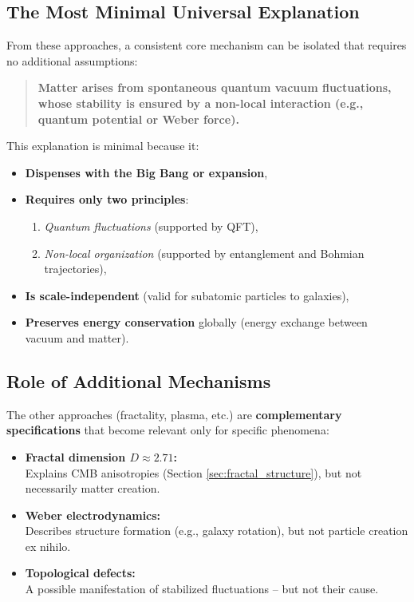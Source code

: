\subsection{The Most Minimal Universal Explanation}
From these approaches, a consistent core mechanism can be isolated that requires no additional assumptions:
\begin{quote}
    \textbf{Matter arises from spontaneous quantum vacuum fluctuations, whose stability is ensured by a non-local interaction (e.g., quantum potential or Weber force).}
\end{quote}
This explanation is minimal because it:
\begin{itemize}
    \item \textbf{Dispenses with the Big Bang or expansion},
    \item \textbf{Requires only two principles}:
    \begin{enumerate}
        \item \textit{Quantum fluctuations} (supported by QFT),
        \item \textit{Non-local organization} (supported by entanglement and Bohmian trajectories),
    \end{enumerate}
    \item \textbf{Is scale-independent} (valid for subatomic particles to galaxies),
    \item \textbf{Preserves energy conservation} globally (energy exchange between vacuum and matter).
\end{itemize}

\subsection{Role of Additional Mechanisms}
The other approaches (fractality, plasma, etc.) are \textbf{complementary specifications} that become relevant only for specific phenomena:
\begin{itemize}
    \item \textbf{Fractal dimension $D \approx 2.71$:}\\Explains CMB anisotropies (Section \ref{sec:fractal_structure}), but not necessarily matter creation.
    \item \textbf{Weber electrodynamics:}\\Describes structure formation (e.g., galaxy rotation), but not particle creation ex nihilo.
    \item \textbf{Topological defects:}\\A possible manifestation of stabilized fluctuations – but not their cause.
\end{itemize}

